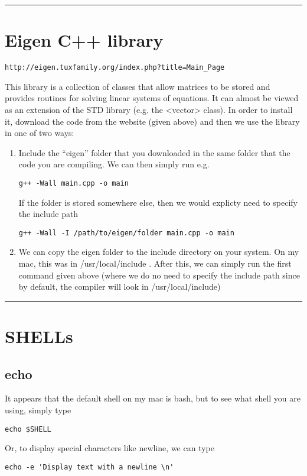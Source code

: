 \documentclass[a4paper, 10pt]{article}
\newcommand{\mybotrule}{\vspace{4mm}\hrule}
\begin{document}
\mybotrule

\vspace{10mm}
\section*{Eigen C++ library}
\begin{verbatim}
http://eigen.tuxfamily.org/index.php?title=Main_Page
\end{verbatim}

This library is a collection of classes that allow matrices to be stored and provides routines for solving linear systems of equations. It can almost be viewed as an extension of the STD library (e.g. the <vector> class). In order to install it, download the code from the website (given above) and then we use the library in one of two ways:
\begin{enumerate}
\item Include the ``eigen'' folder that you downloaded in the same folder that the code you are compiling. We can then simply run  e.g.
\begin{Verbatim}
g++ -Wall main.cpp -o main
\end{Verbatim}
If the folder is stored somewhere else, then we would explicty need to specify the include path
\begin{Verbatim}
g++ -Wall -I /path/to/eigen/folder main.cpp -o main
\end{Verbatim}
\item We can copy the eigen folder to the include directory on your system. On my mac, this was in /usr/local/include . After this, we can simply run the first command given above (where we do no need to specify the include path since by default, the compiler will look in /usr/local/include)
\end{enumerate}

\mybotrule


\vspace{10mm}
\section*{SHELLs}

\subsection*{echo}
It appears that the default shell on my mac is bash, but to see what shell you are using, simply type
\begin{verbatim}
echo $SHELL
\end{verbatim}
Or, to display special characters like newline, we can type
\begin{verbatim}
echo -e 'Display text with a newline \n'
\end{verbatim}
\end{document}
